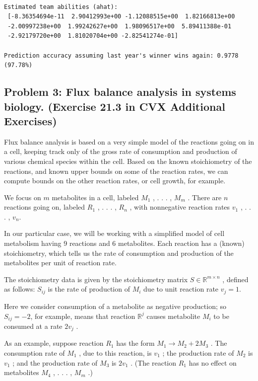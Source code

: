 \documentclass[
  letterpaper,
  DIV=11,
  numbers=noendperiod]{scrartcl}
\begin{document}
\begin{verbatim}

Estimated team abilities (ahat):
 [-8.36354694e-11  2.90412993e+00 -1.12088515e+00  1.82166813e+00
 -2.00997238e+00  1.99242627e+00  1.98096517e+00  5.89411388e-01
 -2.92179720e+00  1.81020704e+00 -2.82541274e-01]

Prediction accuracy assuming last year's winner wins again: 0.9778 (97.78%)
\end{verbatim}

\subsection{Problem 3: Flux balance analysis in systems biology.
(Exercise 21.3 in CVX Additional
Exercises)}\label{problem-3-flux-balance-analysis-in-systems-biology.-exercise-21.3-in-cvx-additional-exercises}

Flux balance analysis is based on a very simple model of the reactions
going on in a cell, keeping track only of the gross rate of consumption
and production of various chemical species within the cell. Based on the
known stoichiometry of the reactions, and known upper bounds on some of
the reaction rates, we can compute bounds on the other reaction rates,
or cell growth, for example.

We focus on \(m\) metabolites in a cell, labeled \(M_1\) , . . . ,
\(M_m\) . There are \(n\) reactions going on, labeled \(R_1\) , . . . ,
\(R_n\) , with nonnegative reaction rates \(v_1\) , . . . , \(v_n\).

In our particular case, we will be working with a simplified model of
cell metabolism having 9 reactions and 6 metabolites. Each reaction has
a (known) stoichiometry, which tells us the rate of consumption and
production of the metabolites per unit of reaction rate.

The stoichiometry data is given by the stoichiometry matrix
\(S \in \mathbb{R}^{m\times n}\) , defined as follows: \(S_{ij}\) is the
rate of production of \(M_i\) due to unit reaction rate \(v_j = 1\).

Here we consider consumption of a metabolite as negative production; so
\(S_{ij} = −2\), for example, means that reaction \(\mathbb{R}^j\)
causes metabolite \(M_i\) to be consumed at a rate \(2v_j\) .

As an example, suppose reaction \(R_1\) has the form
\(M_1 \to M_2 + 2M_3\) . The consumption rate of \(M_1\) , due to this
reaction, is \(v_1\) ; the production rate of \(M_2\) is \(v_1\) ; and
the production rate of \(M_3\) is \(2v_1\) . (The reaction \(R_1\) has
no effect on metabolites \(M_4\) , . . . , \(M_m\) .)
\end{document}
